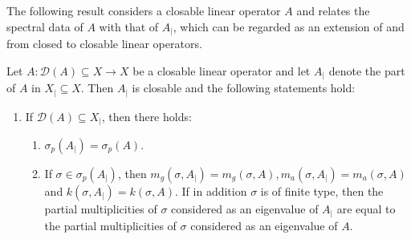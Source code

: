 \documentclass[english]{myarticle}
\begin{document}
\begin{sloppypar}
The following result considers a closable linear operator $A$ and relates the spectral data of $A$ with that of $A_{|}$, which can be regarded as an extension of \cite[Lemma IV.1.15]{Engel2000} and \cite[Proposition 1.1]{Kaashoek1992} from closed to closable linear operators.

\begin{proposition} \label{prop:spectraequal}
Let $A : \mathcal{D}(A) \subseteq X \to X$ be a closable linear operator and let $A_{|}$ denote the part of $A$ in $X_{|} \subseteq X$. Then $A_{|}$ is closable and the following statements hold:
\begin{enumerate}
    \item If $\mathcal{D}(A) \subseteq X_{|}$, then there holds:
    \begin{enumerate}
        \item $\sigma_p(A_{|}) = \sigma_p(A)$.
        \item If $\sigma \in \sigma_p(A_{|})$, then $m_g(\sigma,A_{|}) = m_g(\sigma,A), m_a(\sigma,A_{|}) = m_a(\sigma,A)$ and $k(\sigma,A_{\vert}) = k(\sigma,A)$. If in addition $\sigma$ is of finite type, then the partial multiplicities of $\sigma$ considered as an eigenvalue of $A_{|}$ are equal to the partial multiplicities of $\sigma$ considered as an eigenvalue of $A$.
    \end{enumerate}


\end{enumerate}
\end{proposition}
\end{sloppypar}
\end{document}
